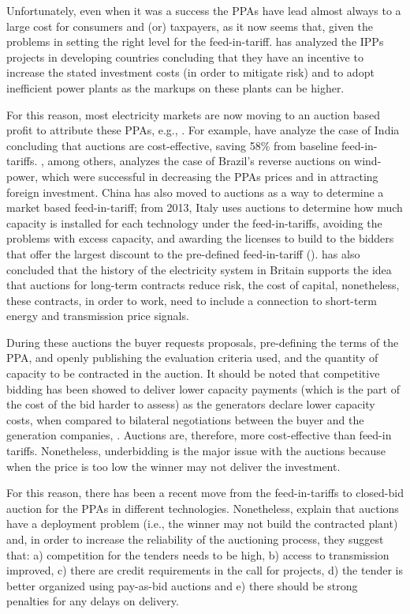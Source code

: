 \documentclass[informs]{informs3}
\begin{document}
Unfortunately, even when it was a success the PPAs have lead almost always to a large cost for consumers and (or) taxpayers, as it now seems that, given the problems in setting the right level for the feed-in-tariff. \cite{Kashi_2015} has analyzed the IPPs projects in developing countries concluding that they have an incentive to increase the stated investment costs (in order to mitigate risk) and to adopt inefficient power plants as the markups on these plants can be higher.  


For this reason, most electricity markets are now moving to an auction based profit to attribute these PPAs, e.g., \cite{IRENA_2015}. For example, \cite{Shrimali_2016} have analyze the case of India concluding that auctions are cost-effective, saving 58\% from baseline feed-in-tariffs. \cite{Cozzi_2012}, among others, analyzes the case of Brazil’s reverse auctions on wind-power, which were successful in decreasing the PPAs prices and in attracting foreign investment. China has also moved to auctions as a way to determine a market based feed-in-tariff; from 2013, Italy uses auctions to determine how much capacity is installed for each technology under the feed-in-tariffs, avoiding the problems with excess capacity, and awarding the licenses to build to the bidders that offer the largest discount to the pre-defined feed-in-tariff (\citealp{IRENA_2015}). \cite{Newbery_2016} has also concluded that the history of the electricity system in Britain supports the idea that auctions for long-term contracts reduce risk, the cost of capital, nonetheless, these contracts, in order to work, need to include a connection to short-term energy and transmission price signals. 

During these auctions the buyer requests proposals, pre-defining the terms of the PPA, and openly publishing the evaluation criteria used, and the quantity of capacity to be contracted in the auction. It should be noted that competitive bidding has been showed to deliver lower capacity payments (which is the part of the cost of the bid harder to assess) as the generators declare lower capacity costs, when compared to bilateral negotiations between the buyer and the generation companies, \cite{Phadke_2009}. Auctions are, therefore, more cost-effective than feed-in tariffs. Nonetheless, underbidding is the major issue with the auctions because when the price is too low the winner may not deliver the investment. 

For this reason, there has been a recent move from the feed-in-tariffs to closed-bid auction for the PPAs in different technologies. Nonetheless, \cite{Electric_power_2004, delRio_Linares_2014, Shrimali_2016} explain that auctions have a deployment problem (i.e., the winner may not build the contracted plant) and, in order to increase the reliability of the auctioning process, they suggest that: a) competition for the tenders needs to be high, b) access to transmission improved, c) there are credit requirements in the call for projects, d) the tender is better organized using pay-as-bid auctions and e) there should be strong penalties for any delays on delivery.
\end{document}
